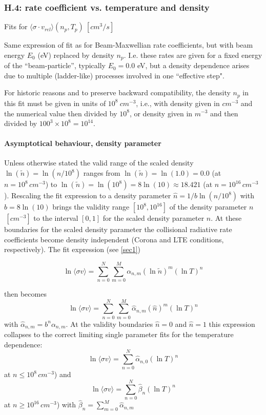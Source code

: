 \documentclass[12pt,dvipdfmx]{article}
\begin{document}
\subsubsection{H.4: rate coefficient vs. temperature and density}\label{sec1.3.4}
Fits for $\langle\sigma \cdot v_{rel}  \rangle (n_p,T_p) \ [cm^3/s]$

Same expression of fit as for Beam-Maxwellian rate coefficients, but with beam energy
$E_0$ (eV) replaced by density $n_p$.
I.e. these rates are given for a fixed energy of the ``beam-particle'', typically $E_0=0.0$ eV,
but a density dependence arises due to multiple (ladder-like) processes involved in one ``effective step".

For historic reasons and to
preserve backward compatibility, the density $n_p$ in this fit must be
given in units of $10^8 \ cm^{-3}$, i.e., with density given in $cm^{-3}$ and
the numerical value then divided by $10^8$, or density given in $m^{-3}$ and then
divided by $100^3 \times 10^8 = 10^{14}$.

\paragraph{Asymptotical behaviour, density parameter}
Unless otherwise stated the valid range of the scaled density $\ln(\tilde n) = \ln (n/10^8)$ ranges from $\ln(\tilde n) = \ln(1.0) = 0.0$  (at $n=10^8 \, cm^{-3}$)
to $\ln(\tilde n) = \ln(10^8) = 8 \ln(10) \approx 18.421$  (at $n=10^{16} \, cm^{-3}$).  Rescaling the fit expression to a density parameter
$\hat n = 1/b \ln(n/10^8)$ with $b = 8 \ln(10)$ brings the validity range $[10^8 ,10^{16}]$ of the density parameter $n$ $\, [cm^{-3}]$  to the
interval $[0, 1]$ for the scaled density parameter $\hat n$. At these boundaries for the scaled density parameter the collisional radiative rate coefficients
become density independent (Corona and LTE conditions, respectively).
The fit expression (see \ref{sec1})

$$\ln \langle\sigma v\rangle = \sum_{n=0}^N\sum_{m=0}^M \alpha_{n,m}(\ln \tilde{n})^m(\ln T)^n $$

then becomes
$$\ln \langle\sigma v\rangle = \sum_{n=0}^N\sum_{m=0}^M \hat\alpha_{n,m}(\hat{n})^m(\ln T)^n $$
with $ \hat\alpha_{n,m} = b^n \alpha_{n,m}$. At the validity boundaries $\hat n =0$  and $\hat n  =1$
this expression collapses to the correct limiting single parameter fits for the temperature dependence:
$$\ln \langle\sigma v\rangle = \sum_{n=0}^N\hat\alpha_{n,0}(\ln T)^n $$ at $ n\leq 10^8 \,  cm^{-3}$)
and
$$\ln \langle\sigma v\rangle = \sum_{n=0}^N\hat\beta_{n}(\ln T)^n $$ at $ n \geq 10^{16} \,  cm^{-3}$)
with $\hat\beta_{n} = \sum_{m=0}^M \hat\alpha_{n,m}$
\end{document}
